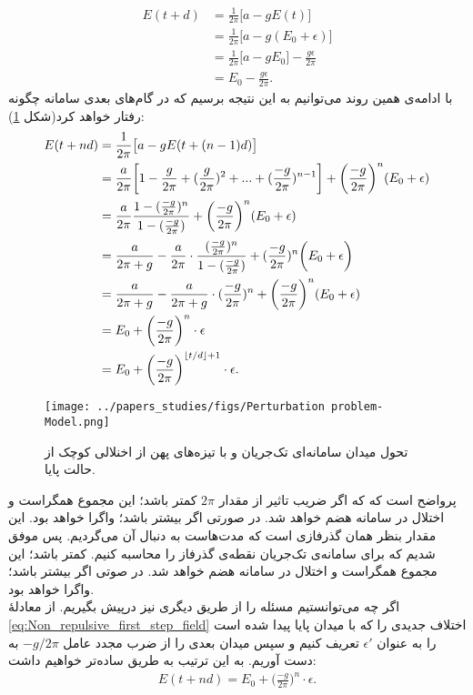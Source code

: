 \begin{align}
	E(t+d) &= \frac{1}{2\pi} \big[ a - g E(t) \big]\\
	&=  \frac{1}{2\pi} \big[ a - g (E_0 + \epsilon) \big]\\
	&=  \frac{1}{2\pi} \big[ a - g E_0 \big] - \frac{g\epsilon}{2\pi}\\
	&= E_0 - \frac{g\epsilon}{2\pi} .  \label{eq:Non_repulsive_first_step_field}
\end{align}
با ادامه‌ی همین روند می‌توانیم به این نتیجه برسیم که در گام‌های بعدی سامانه چگونه رفتار خواهد کرد(شکل \ref{fig:non_repulsive_single_input_perturbation}): 
\begin{align}
	E(t + nd) &= \frac{1}{2\pi} \big[ a - g E(t+(n-1)d) \big]\\
	&= \frac{a}{2\pi} \bigg[ 1 - \frac{g}{2\pi} + (\frac{g}{2\pi})^2 + ... + (\frac{-g}{2\pi})^{n - 1} \bigg] + \bigg(\frac{-g}{2\pi}\bigg)^{n} (E_0 + \epsilon)
	\label{eq:geometric_sum}\\
	&= \frac{a}{2\pi} \frac{1 - (\frac{-g}{2\pi})^{n} }{ 1 - (\frac{-g}{2\pi})} + \bigg(\frac{-g}{2\pi}\bigg)^{n} (E_0 + \epsilon)\\
	&= \frac{a}{2\pi + g} - \frac{a}{2\pi} \cdot \frac{ (\frac{-g}{2\pi})^{n} }{ 1 - (\frac{-g}{2\pi})} + (\frac{-g}{2\pi})^{n} \bigg(E_0 + \epsilon\bigg)\\
	&= \frac{a}{2\pi + g} - \frac{a}{2\pi + g} \cdot (\frac{-g}{2\pi})^{n} + \bigg(\frac{-g}{2\pi}\bigg)^{n} (E_0 + \epsilon)\\
	&= E_0 + \bigg(\frac{-g}{2\pi}\bigg)^n \cdot \epsilon\\
	&= E_0 + \bigg(\frac{-g}{2\pi}\bigg)^{\left\lfloor t/d \right\rfloor + 1} \cdot \epsilon .
	\label{eq:non_repulsive_field_time}
\end{align}

\begin{figure}[h]
	\centering
	\texttt{[image: ../papers\_studies/figs/Perturbation problem-Model.png]}
	\caption{
		تحول میدان سامانه‌ای تک‌جریان و با تیزه‌های پهن از اخنلالی کوچک از حالت پایا.
	}
	\label{fig:non_repulsive_single_input_perturbation}
\end{figure}

پرواضح است که که اگر ضریب تاثیر از مقدار 
$2\pi$
کمتر باشد؛ این مجموع همگراست و اختلال در سامانه هضم خواهد شد. در صورتی اگر بیشتر باشد؛ واگرا خواهد بود. این مقدار بنظر همان گذرفازی است که مدت‌هاست به دنبال آن می‌گردیم. پس موفق شدیم که برای سامانه‌ی تک‌جریان نقطه‌ی گذرفاز را محاسبه کنیم. کمتر باشد؛ این مجموع همگراست و اختلال در سامانه‌ هضم خواهد شد. در صوتی اگر بیشتر باشد؛ واگرا خواهد بود.\\
اگر چه می‌توانستیم مسئله را از طریق دیگری نیز درپیش بگیریم. از معادلهٔ 
\ref{eq:Non_repulsive_first_step_field}
اختلاف جدیدی را که با میدان پایا پیدا شده است را به عنوان 
$\epsilon'$
تعریف کنیم و سپس میدان بعدی را از ضرب مجدد عامل
$ - g/2\pi$
به دست آوریم. به این ترتیب به طریق ساده‌تر خواهیم داشت:
\begin{align}
	E(t+nd) = E_0 + \big(\frac{-g}{2\pi}\big)^n \cdot \epsilon .
\end{align}

